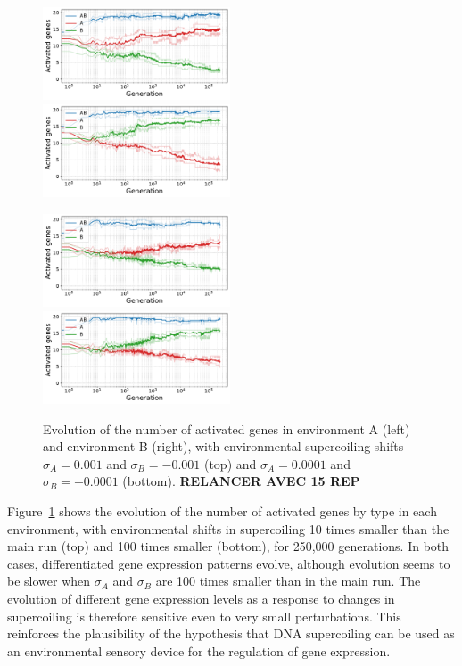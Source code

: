 \begin{figure}[H]
\centering
\includegraphics[width=0.495\textwidth]{param/sigma/sigma-1e-3/gene_activity_env_A.pdf}
\includegraphics[width=0.495\textwidth]{param/sigma/sigma-1e-3/gene_activity_env_B.pdf}

\includegraphics[width=0.495\textwidth]{param/sigma/sigma-1e-4/gene_activity_env_A.pdf}
\includegraphics[width=0.495\textwidth]{param/sigma/sigma-1e-4/gene_activity_env_B.pdf}
\caption[Evolution of the number of activated genes in each environment, with decreasing environmental supercoiling shifts]{Evolution of the number of activated genes in environment A (left) and environment B (right), with environmental supercoiling shifts $\sigma_A = 0.001$ and $\sigma_B = -0.001$ (top) and $\sigma_A = 0.0001$ and $\sigma_B = -0.0001$ (bottom). \textbf{RELANCER AVEC 15 REP}}
\label{fig:param:sigma-activ-by-env}
\end{figure}

Figure~\ref{fig:param:sigma-activ-by-env} shows the evolution of the number of activated genes by type in each environment, with environmental shifts in supercoiling 10 times smaller than the main run (top) and 100 times smaller (bottom), for 250,000 generations.
In both cases, differentiated gene expression patterns evolve, although evolution seems to be slower when $\sigma_A$ and $\sigma_B$ are 100 times smaller than in the main run.
The evolution of different gene expression levels as a response to changes in supercoiling is therefore sensitive even to very small perturbations.
This reinforces the plausibility of the hypothesis that DNA supercoiling can be used as an environmental sensory device for the regulation of gene expression.


